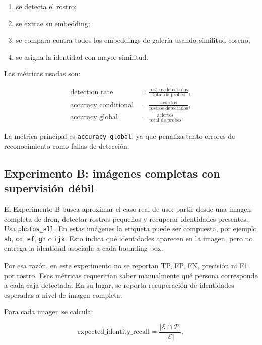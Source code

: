 \documentclass[11pt]{article}
\begin{document}
\begin{enumerate}
    \item se detecta el rostro;
    \item se extrae su embedding;
    \item se compara contra todos los embeddings de galería usando similitud coseno;
    \item se asigna la identidad con mayor similitud.
\end{enumerate}

Las métricas usadas son:

\begin{align}
    \text{detection\_rate} &= \frac{\text{rostros detectados}}{\text{total de probes}}, \\
    \text{accuracy\_conditional} &= \frac{\text{aciertos}}{\text{rostros detectados}}, \\
    \text{accuracy\_global} &= \frac{\text{aciertos}}{\text{total de probes}}.
\end{align}

La métrica principal es \texttt{accuracy\_global}, ya que penaliza tanto errores de reconocimiento como fallas de detección.

\subsection{Experimento B: imágenes completas con supervisión débil}

El Experimento B busca aproximar el caso real de uso: partir desde una imagen completa de dron, detectar rostros pequeños y recuperar identidades presentes. Usa \texttt{photos\_all}. En estas imágenes la etiqueta puede ser compuesta, por ejemplo \texttt{ab}, \texttt{cd}, \texttt{ef}, \texttt{gh} o \texttt{ijk}. Esto indica qué identidades aparecen en la imagen, pero no entrega la identidad asociada a cada bounding box.

Por esa razón, en este experimento no se reportan TP, FP, FN, precisión ni F1 por rostro. Esas métricas requerirían saber manualmente qué persona corresponde a cada caja detectada. En su lugar, se reporta recuperación de identidades esperadas a nivel de imagen completa.

Para cada imagen se calcula:

\begin{equation}
    \text{expected\_identity\_recall}
    =
    \frac{|\mathcal{E} \cap \mathcal{P}|}{|\mathcal{E}|},
\end{equation}
\end{document}
